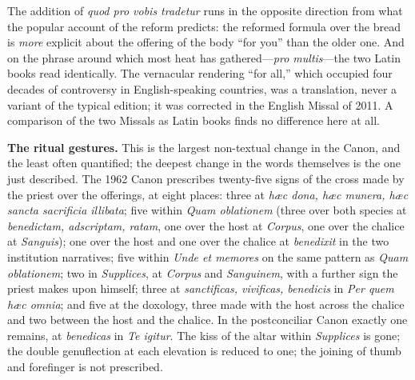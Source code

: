 The addition of \emph{quod pro vobis tradetur} runs in the opposite direction from what the popular account of the reform predicts: the reformed formula over the bread is \emph{more} explicit about the offering of the body ``for you'' than the older one. And on the phrase around which most heat has gathered---\emph{pro multis}---the two Latin books read identically. The vernacular rendering ``for all,'' which occupied four decades of controversy in English-speaking countries, was a translation, never a variant of the typical edition; it was corrected in the English Missal of 2011. A comparison of the two Missals as Latin books finds no difference here at all.

\textbf{The ritual gestures.} This is the largest non-textual change in the Canon, and the least often quantified; the deepest change in the words themselves is the one just described. The 1962 Canon prescribes twenty-five signs of the cross made by the priest over the offerings, at eight places: three at \emph{hæc dona, hæc munera, hæc sancta sacrificia illibata}; five within \emph{Quam oblationem} (three over both species at \emph{benedictam, adscriptam, ratam}, one over the host at \emph{Corpus}, one over the chalice at \emph{Sanguis}); one over the host and one over the chalice at \emph{benedixit} in the two institution narratives; five within \emph{Unde et memores} on the same pattern as \emph{Quam oblationem}; two in \emph{Supplices}, at \emph{Corpus} and \emph{Sanguinem}, with a further sign the priest makes upon himself; three at \emph{sanctificas, vivificas, benedicis} in \emph{Per quem hæc omnia}; and five at the doxology, three made with the host across the chalice and two between the host and the chalice. In the postconciliar Canon exactly one remains, at \emph{benedicas} in \emph{Te igitur}. The kiss of the altar within \emph{Supplices} is gone; the double genuflection at each elevation is reduced to one; the joining of thumb and forefinger is not prescribed.

